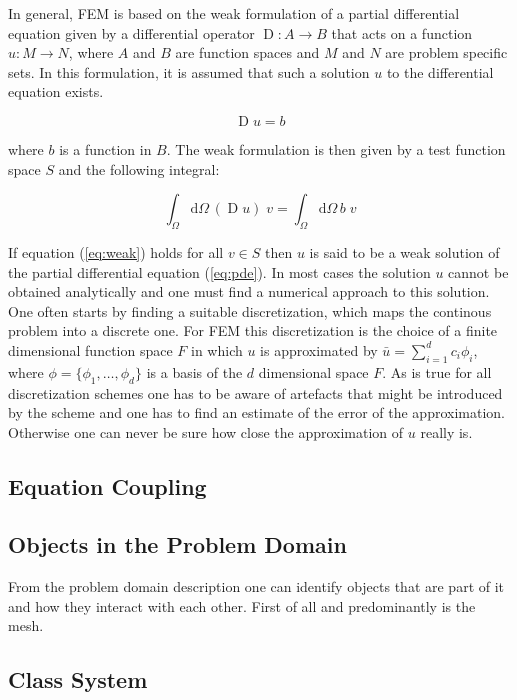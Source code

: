 \documentclass[10pt,a4paper,twocolumn]{article}
\DeclareMathOperator \D {D}
\begin{document}
In general, FEM is based on the weak formulation of a partial differential equation given by a differential operator $\D : A \rightarrow B$ that acts on a function $u : M \rightarrow N$, where $A$ and $B$ are function spaces and $M$ and $N$ are problem specific sets. In this formulation, it is assumed that such a solution $u$ to the differential equation exists.

\begin{equation}
\D u = b
\label{eq:pde}
\end{equation}

where $b$ is a function in $B$. The weak formulation is then given by a test function space $S$ and the following integral:

\begin{equation}
\int_\Omega \text{d}\Omega\,(\D u)\;v = \int_\Omega \text{d}\Omega \, b\;v
\label{eq:weak}
\end{equation}

If equation (\ref{eq:weak}) holds for all $v \in S$ then $u$ is said to be a weak solution of the partial differential equation (\ref{eq:pde}).
In most cases the solution $u$ cannot be obtained analytically and one must find a numerical approach to this solution. One often starts by finding a suitable discretization, which maps the continous problem into a discrete one. For FEM this discretization is the choice of a finite dimensional function space $F$ in which $u$ is approximated by $\bar{u} = \sum_{i=1}^d c_i \phi_i$, where $\phi = \{ \phi_1, \dots, \phi_d\}$ is a basis of the $d$ dimensional space $F$. As is true for all discretization schemes one has to be aware of artefacts that might be introduced by the scheme and one has to find an estimate of the error of the approximation. Otherwise one can never be sure how close the approximation of $u$ really is.

\subsection{Equation Coupling}

\subsection{Objects in the Problem Domain}

From the problem domain description one can identify objects that are part of it and how they interact with each other. First of all and predominantly is the mesh. 

\subsection{Class System}
\end{document}

